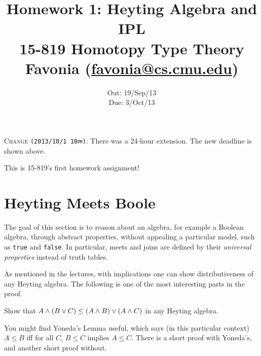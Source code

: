 \documentclass[12pt]{article}
\title{\Large\textbf{
  Homework 1: Heyting Algebra and IPL}
\normalsize\\
15-819 Homotopy Type Theory\\
Favonia (\href{mailto:favonia@cs.cmu.edu}{favonia@cs.cmu.edu})}
\author{}
\date{%
Out: 19/Sep/13\\
Due: 3/Oct/13
}
\newcommand{\showextra}[1]{\color{DarkOliveGreen}#1\normalcolor}
\begin{document}
\maketitle

\showextra{
  \begin{mdframed}[style=extra]
    \textsc{Change \texttt{(2013/10/1 10pm)}:} There was a 24-hour extension.
    The new deadline is shown above.
  \end{mdframed}
}

This is 15-819's first homework assignment!

\section{Heyting Meets Boole}

The goal of this section is to reason about an algebra,
for example a Boolean algebra,
through abstract properties,
without appealing a particular model,
such as \texttt{true} and \texttt{false}.
In particular, meets and joins are defined by their \emph{universal properties}
instead of truth tables.

As mentioned in the lectures, with implications one can show distributiveness
of any Heyting algebra.
The following is one of the most interesting parts in the proof.
\begin{task}
  Show that $A \wedge (B \vee C) \leq (A \wedge B) \vee (A \wedge C)$
  in any Heyting algebra.

  \begin{hint}
    You might find Yoneda's Lemma useful, which says (in this particular context)
    $A \leq B$ iff for all $C$, $B \leq C$ implies $A \leq C$.
    There is a short proof with Yoneda's, and another short proof without.
  \end{hint}
\end{task}
\end{document}
